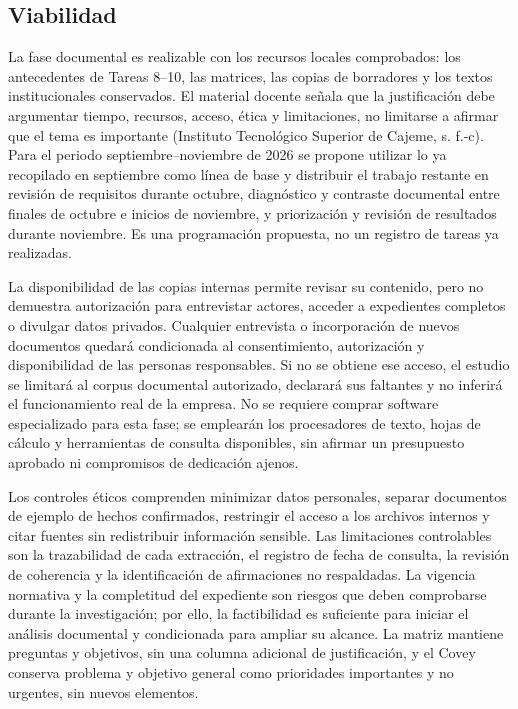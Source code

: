 {\subsection{Viabilidad}
La fase documental es realizable con los recursos locales comprobados: los antecedentes de Tareas 8–10, las matrices, las copias de borradores y los textos institucionales conservados. El material docente señala que la justificación debe argumentar tiempo, recursos, acceso, ética y limitaciones, no limitarse a afirmar que el tema es importante (Instituto Tecnológico Superior de Cajeme, s. f.-c). Para el periodo septiembre–noviembre de 2026 se propone utilizar lo ya recopilado en septiembre como línea de base y distribuir el trabajo restante en revisión de requisitos durante octubre, diagnóstico y contraste documental entre finales de octubre e inicios de noviembre, y priorización y revisión de resultados durante noviembre. Es una programación propuesta, no un registro de tareas ya realizadas.


La disponibilidad de las copias internas permite revisar su contenido, pero no demuestra autorización para entrevistar actores, acceder a expedientes completos o divulgar datos privados. Cualquier entrevista o incorporación de nuevos documentos quedará condicionada al consentimiento, autorización y disponibilidad de las personas responsables. Si no se obtiene ese acceso, el estudio se limitará al corpus documental autorizado, declarará sus faltantes y no inferirá el funcionamiento real de la empresa. No se requiere comprar software especializado para esta fase; se emplearán los procesadores de texto, hojas de cálculo y herramientas de consulta disponibles, sin afirmar un presupuesto aprobado ni compromisos de dedicación ajenos.


Los controles éticos comprenden minimizar datos personales, separar documentos de ejemplo de hechos confirmados, restringir el acceso a los archivos internos y citar fuentes sin redistribuir información sensible. Las limitaciones controlables son la trazabilidad de cada extracción, el registro de fecha de consulta, la revisión de coherencia y la identificación de afirmaciones no respaldadas. La vigencia normativa y la completitud del expediente son riesgos que deben comprobarse durante la investigación; por ello, la factibilidad es suficiente para iniciar el análisis documental y condicionada para ampliar su alcance. La matriz mantiene preguntas y objetivos, sin una columna adicional de justificación, y el Covey conserva problema y objetivo general como prioridades importantes y no urgentes, sin nuevos elementos.


}
